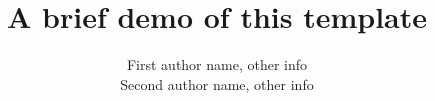 \documentclass[handout,aspectratio=169]{beamer}
\title{%
	A brief demo of this template
}
\author{%
	First author name, other info\\
	Second author name, other info
}
\begin{document}
	\begin{frame}
		\titlepage
	\end{frame}

	
\end{document}
